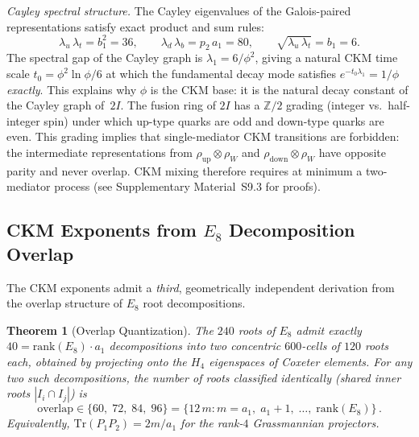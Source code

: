 \documentclass[12pt,a4paper]{article}
\newtheorem{theorem}{Theorem}
\theoremstyle{definition}
\begin{document}
\noindent\textit{Cayley spectral structure.}  The Cayley eigenvalues of the Galois-paired representations satisfy exact product and sum rules:
\begin{equation}
\lambda_u \,\lambda_t = b_1^2 = 36, \qquad
\lambda_d \,\lambda_b = p_2\,a_1 = 80, \qquad
\sqrt{\lambda_u\,\lambda_t} = b_1 = 6.
\label{eq:cayley_products}
\end{equation}
The spectral gap of the Cayley graph is $\lambda_1 = 6/\phi^2$, giving a natural CKM time scale $t_0 = \phi^2 \ln\phi / 6$ at which the fundamental decay mode satisfies $e^{-t_0 \lambda_1} = 1/\phi$ \emph{exactly}.  This explains why $\phi$ is the CKM base: it is the natural decay constant of the Cayley graph of~$2I$.  The fusion ring of $2I$ has a $\mathbb{Z}/2$ grading (integer vs.\ half-integer spin) under which up-type quarks are odd and down-type quarks are even.  This grading implies that single-mediator CKM transitions are forbidden: the intermediate representations from $\rho_{\text{up}} \otimes \rho_W$ and $\rho_{\text{down}} \otimes \rho_W$ have opposite parity and never overlap.  CKM mixing therefore requires at minimum a two-mediator process (see Supplementary Material~S9.3 for proofs).

\subsection{CKM Exponents from $E_8$ Decomposition Overlap}
\label{sec:e8_overlap_ckm}

The CKM exponents admit a \emph{third}, geometrically independent derivation from the overlap structure of $E_8$ root decompositions.

\begin{theorem}[Overlap Quantization]
\label{thm:overlap_quant}
The $240$ roots of $E_8$ admit exactly $40 = \mathrm{rank}(E_8)\cdot a_1$ decompositions into two concentric $600$-cells of $120$ roots each, obtained by projecting onto the $H_4$ eigenspaces of Coxeter elements.  For any two such decompositions, the number of roots classified identically (shared inner roots $|I_i \cap I_j|$) is
\begin{equation}
\boxed{\mathrm{overlap} \in \{60,\; 72,\; 84,\; 96\} = \bigl\{12\,m : m = a_1,\; a_1\!+\!1,\; \ldots,\; \mathrm{rank}(E_8)\bigr\}}\,.
\label{eq:overlap_quant}
\end{equation}
Equivalently, $\mathrm{Tr}(P_1 P_2) = 2m/a_1$ for the rank-$4$ Grassmannian projectors.
\end{theorem}
\end{document}
